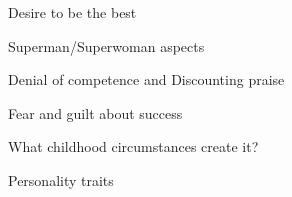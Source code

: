 \documentclass[aspectratio=169]{beamer}
\begin{document}
\begin{frame}
  \begin{center}
    \Huge Desire to be the best
    \\ \small \cite{sakulku11}
  \end{center}
\end{frame}

\begin{frame}
  \begin{center}
    \Huge Superman/Superwoman aspects
    \\ \small \cite{sakulku11}
  \end{center}
\end{frame}

\begin{frame}
  \begin{center}
    \Huge Denial of competence and Discounting praise
    \\ \small \cite{sakulku11}
  \end{center}
\end{frame}

\begin{frame}
  \begin{center}
    \Huge Fear and guilt about success
    \\ \small \cite{sakulku11}
  \end{center}
\end{frame}


\begin{frame}
  \begin{center}
    \Huge What childhood circumstances create it?

    \small \cite{sakulku11}
  \end{center}
\end{frame}

\begin{frame}
  \begin{center}
    \Huge Personality traits
    \\ \small \cite{hh15}
  \end{center}
\end{frame}
\end{document}
